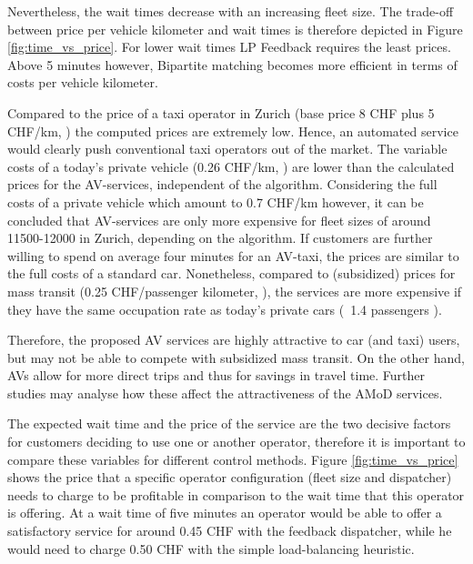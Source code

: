 Nevertheless, the wait times decrease with an increasing fleet size. The trade-off between price per vehicle kilometer and wait times is therefore depicted in Figure \ref{fig:time_vs_price}. For lower wait times LP Feedback requires the least prices. Above 5 minutes however, Bipartite matching becomes more efficient in terms of costs per vehicle kilometer.


Compared to the price of a taxi operator in Zurich (base price 8 CHF plus 5 CHF/km, \cite{StadtZurich2014})
the computed prices are extremely low. Hence, an automated service would clearly
push conventional taxi operators out of the market. The variable costs of a today's
private vehicle (0.26 CHF/km, \cite{TCS2016}) are lower than the calculated prices for the AV-services,
independent of the algorithm. Considering the full costs of a private vehicle which amount to 0.7 CHF/km \cite{TCS2016} however, it can be concluded that AV-services are only more expensive for fleet sizes of around 11500-12000
in Zurich, depending on the algorithm. If customers are further willing to spend on average four minutes
for an AV-taxi, the prices are similar to the full costs of a standard car.
Nonetheless, compared to (subsidized) prices for mass transit (0.25 CHF/passenger kilometer, \cite{Bosch2016a}), the services are more expensive if they have the same occupation rate as today's private cars (~1.4 passengers \cite{Bosch2016a}).

Therefore, the proposed AV services are highly attractive to car (and taxi) users, but may
not be able to compete with subsidized mass transit. On the other hand, AVs
allow for more direct trips and thus for savings in travel time. Further studies
may analyse how these affect the attractiveness of the AMoD services.

The expected wait time and the price of the service are the two decisive factors
for customers deciding to use one or another operator, therefore it is important
to compare these variables for different control methods. Figure \ref{fig:time_vs_price}
shows the price that a specific operator configuration (fleet size and dispatcher)
needs to charge to be profitable in comparison to the wait time that this operator is offering.
At a wait time of five minutes an operator would be able to offer a satisfactory service for
around 0.45 CHF with the feedback dispatcher, while he would need to charge 0.50 CHF
with the simple load-balancing heuristic.

